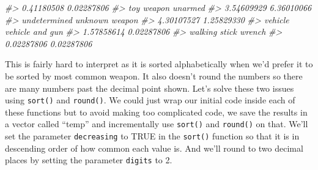 \documentclass[
]{krantz}
\makeatletter
\newenvironment{Shaded}{\begin{snugshade}}{\end{snugshade}}
\newcommand{\CommentTok}[1]{\textcolor[rgb]{0.37,0.37,0.37}{\textit{#1}}}
\newenvironment{kframe}{%
\medskip{}
\setlength{\fboxsep}{.8em}
 \def\at@end@of@kframe{}%
 \ifinner\ifhmode%
  \def\at@end@of@kframe{\end{minipage}}%
  \begin{minipage}{\columnwidth}%
 \fi\fi%
 \def\FrameCommand##1{\hskip\@totalleftmargin \hskip-\fboxsep
 \colorbox{shadecolor}{##1}\hskip-\fboxsep
     \hskip-\linewidth \hskip-\@totalleftmargin \hskip\columnwidth}%
 \MakeFramed {\advance\hsize-\width
   \@totalleftmargin\z@ \linewidth\hsize
   \@setminipage}}%
 {\par\unskip\endMakeFramed%
 \at@end@of@kframe}
\renewenvironment{Shaded}{\begin{kframe}}{\end{kframe}}
\makeatother
\begin{document}
\begin{Shaded}
\begin{Highlighting}[]
\CommentTok{\#\textgreater{}                       0.41180508                       0.02287806 }
\CommentTok{\#\textgreater{}                       toy weapon                          unarmed }
\CommentTok{\#\textgreater{}                       3.54609929                       6.36010066 }
\CommentTok{\#\textgreater{}                     undetermined                   unknown weapon }
\CommentTok{\#\textgreater{}                       4.30107527                       1.25829330 }
\CommentTok{\#\textgreater{}                          vehicle                  vehicle and gun }
\CommentTok{\#\textgreater{}                       1.57858614                       0.02287806 }
\CommentTok{\#\textgreater{}                    walking stick                           wrench }
\CommentTok{\#\textgreater{}                       0.02287806                       0.02287806}
\end{Highlighting}
\end{Shaded}

This is fairly hard to interpret as it is sorted alphabetically when we'd prefer it to be sorted by most common weapon. It also doesn't round the numbers so there are many numbers past the decimal point shown. Let's solve these two issues using \texttt{sort()} and \texttt{round()}. We could just wrap our initial code inside each of these functions but to avoid making too complicated code, we save the results in a vector called ``temp'' and incrementally use \texttt{sort()} and \texttt{round()} on that. We'll set the parameter \texttt{decreasing} to TRUE in the \texttt{sort()} function so that it is in descending order of how common each value is. And we'll round to two decimal places by setting the parameter \texttt{digits} to 2.
\end{document}
